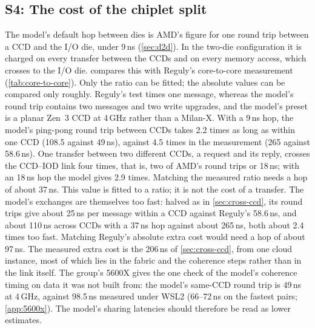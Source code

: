 \subsection{S4: The cost of the chiplet split}
\label{sec:sim-chiplet}
The model's default hop between dies is AMD's figure for one round trip between a CCD and the I/O die, under 9\,ns (\cref{sec:d2d}). In the two-die configuration it is charged on every transfer between the CCDs and on every memory access, which crosses to the I/O die.  compares this with Reguly's core-to-core measurement (\cref{tab:core-to-core}). Only the ratio can be fitted; the absolute values can be compared only roughly. Reguly's test times one message, whereas the model's round trip contains two messages and two write upgrades, and the model's preset is a planar Zen~3 CCD at 4\,GHz rather than a Milan-X. With a 9\,ns hop, the model's ping-pong round trip between CCDs takes 2.2 times as long as within one CCD (108.5 against 49\,ns), against 4.5 times in the measurement (265 against 58.6\,ns). One transfer between two different CCDs, a request and its reply, crosses the CCD--IOD link four times, that is, two of AMD's round trips or 18\,ns; with an 18\,ns hop the model gives 2.9 times. Matching the measured ratio needs a hop of about 37\,ns. This value is fitted to a ratio; it is not the cost of a transfer. The model's exchanges are themselves too fast: halved as in \cref{sec:cross-ccd}, its round trips give about 25\,ns per message within a CCD against Reguly's 58.6\,ns, and about 110\,ns across CCDs with a 37\,ns hop against about 265\,ns, both about 2.4 times too fast. Matching Reguly's absolute extra cost would need a hop of about 97\,ns. The measured extra cost is the 206\,ns of \cref{sec:cross-ccd}, from one cloud instance, most of which lies in the fabric and the coherence steps rather than in the link itself. The group's 5600X gives the one check of the model's coherence timing on data it was not built from: the model's same-CCD round trip is 49\,ns at 4\,GHz, against 98.5\,ns measured under WSL2 (66--72\,ns on the fastest pairs; \cref{app:5600x}). The model's sharing latencies should therefore be read as lower estimates.

